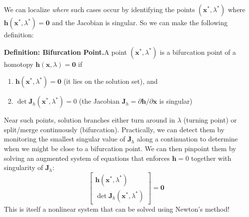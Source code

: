 We can localize \emph{where} such cases occur by identifying the points $(\mathbf{x}^*,\lambda^*)$ where $\mathbf{h}(\mathbf{x}^*,\lambda^*)=\mathbf{0}$ and the Jacobian is singular. So we can make the following definition:
\begin{definitionBox}
    \textbf{Definition: Bifurcation Point.}\quad A point $(\mathbf{x}^*,\lambda^*)$ is a bifurcation point of a homotopy $\mathbf{h}(\mathbf{x},\lambda)=\mathbf{0}$ if
    \begin{enumerate}
        \item $\mathbf{h}(\mathbf{x}^*,\lambda^*)=\mathbf{0}$ \quad (it lies on the solution set), and
        \item $\det \mathbf{J}_h(\mathbf{x}^*,\lambda^*)=0$ \quad (the Jacobian $\mathbf{J}_h=\partial \mathbf{h}/\partial \mathbf{x}$ is singular)
    \end{enumerate}
\end{definitionBox}
Near such points, solution branches either turn around in $\lambda$ (turning point) or split/merge continuously (bifurcation). Practically, we can detect them by monitoring the smallest singular value of $\mathbf{J}_h$ along a continuation to determine when we might be close to a bifurcation point. We can then pinpoint them by solving an augmented system of equations that enforces $\mathbf{h}=0$ together with singularity of $\mathbf{J}_h$:
\begin{equation}
    \begin{bmatrix}
    \mathbf{h}(\mathbf{x}^*,\lambda^*) \\
    \det \mathbf{J}_h(\mathbf{x}^*,\lambda^*)
    \end{bmatrix} = \mathbf{0}
\end{equation}
This is itself a nonlinear system that can be solved using Newton's method!

